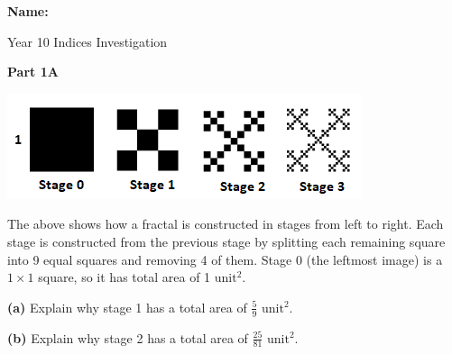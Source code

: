 \documentclass{article}
\begin{document}


{\Large \textbf{Name:}} \hspace{3cm} \vspace{1cm}

\begin{center}
{\Huge Year 10 Indices Investigation}
\end{center}

{\Large 

\textbf{Part 1A} \\[-6pt]

\begin{center}
\includegraphics{./fractal.png}
\end{center}

The above shows how a fractal is constructed  in stages from left to right. Each stage is constructed from the previous stage by splitting each remaining square into 9 equal squares and removing 4 of them. Stage 0 (the leftmost image) is a $1 \times 1$ square, so it has total area of 1 $\text{unit}^2$.
\vspace{0.4cm}

\textbf{(a)} Explain why stage 1 has a total area of {\huge $\frac{5}{9}$} $\text{unit}^2$.

\vspace{0.4cm}
\begin{center}
\end{center}
\vspace{0.2cm}

\textbf{(b)} Explain why stage 2 has a total area of {\huge $\frac{25}{81}$} $\text{unit}^2$.

\vspace{0.4cm}
\begin{center}
\end{center}
\vspace{0.2cm}


}
\end{document}
